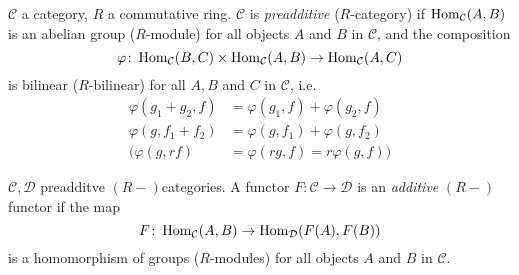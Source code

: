 
\begin{defin}
$\mathcal{C}$ a category, $R$ a commutative ring. $\mathcal{C}$ is
\emph{preadditive} ($R$-category) if $\operatorname{Hom}_\mathcal{C}(A,B)$ is an
abelian group ($R$-module) for all objects $A$ and $B$ in
$\mathcal{C}$, and the composition \[ \varphi\colon
  \operatorname{Hom}_\mathcal{C}(B,C) \times \operatorname{Hom}_\mathcal{C}(A,B) \to
  \operatorname{Hom}_\mathcal{C}(A,C) \] is bilinear ($R$-bilinear) for all $A,B$
and $C$ in $\mathcal{C}$, i.e.\ 
\begin{equation*}
\begin{split}
\varphi(g_1 + g_2, f) &= \varphi(g_1,f) + \varphi(g_2, f)\\
\varphi(g, f_1 + f_2) &= \varphi(g, f_1) + \varphi(g, f_2)\\
\Big(\varphi(g, rf) &= \varphi(rg, f) = r\varphi(g,f)\Big)
\end{split}
\end{equation*}
\end{defin}

\begin{defin}
$\mathcal{C}, \mathcal{D}$ preadditve $(R-)$categories. A functor
$F\colon  \mathcal{C} \to \mathcal{D}$ is an \emph{additive}
$(R-)$functor if the map \[ F\colon  \operatorname{Hom}_\mathcal{C}(A, B) \to
  \operatorname{Hom}_\mathcal{D}(F(A), F(B))\] is a homomorphism of groups
($R$-modules) for all objects $A$ and $B$ in $\mathcal{C}$. 
\end{defin}

